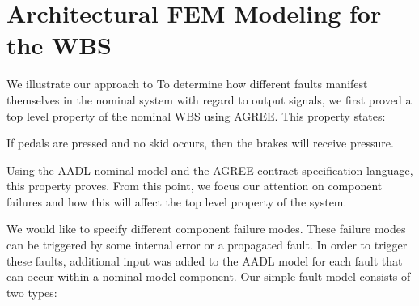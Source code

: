\section{Architectural FEM Modeling for the WBS}

We illustrate our approach to 
To determine how different faults manifest themselves in the nominal system with regard to output signals, we first proved a top level property of the nominal WBS using AGREE. This property states: \\

\begin{tt}
If pedals are pressed and no skid occurs, then the brakes will receive pressure. \\
\end{tt}

Using the AADL nominal model and the AGREE contract specification language, this property proves. From this point, we focus our attention on component failures and how this will affect the top level property of the system.

We would like to specify different component failure modes. These failure modes can be triggered by some internal error or a propagated fault. In order to trigger these faults, additional input was added to the AADL model for each fault that can occur within a nominal model component. Our simple fault model consists of two types:


